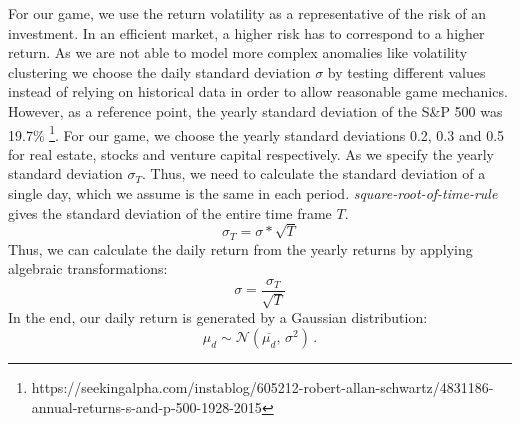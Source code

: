 For our game, we use the return volatility as a representative of the risk of an investment. In an efficient market, a higher risk has to correspond to a higher return. As we are not able to model more complex anomalies like volatility clustering \cite{lux2000volatility} we choose the daily standard deviation $\sigma$ by testing different values instead of relying on historical data in order to allow reasonable game mechanics. However, as a reference point, the yearly standard deviation of the S\&P 500 was 19.7\% \footnote{https://seekingalpha.com/instablog/605212-robert-allan-schwartz/4831186-annual-returns-s-and-p-500-1928-2015}. For our game, we choose the yearly standard deviations 0.2, 0.3 and 0.5 for real estate, stocks and venture capital respectively.
As we specify the yearly standard deviation $\sigma_T$. Thus, we need to calculate the standard deviation of a single day, which we assume is the same in each period. \textit{square-root-of-time-rule} gives the standard deviation of the entire time frame $T$.
\begin{equation}
    \sigma_T = \sigma*\sqrt{T}
\end{equation}
Thus, we can calculate the daily return from the yearly returns by applying algebraic transformations:
\begin{equation}
    \sigma = \frac{\sigma_T}{\sqrt{T}}
\end{equation}
In the end, our daily return is generated by a Gaussian distribution:
\begin{equation}
	\mu_d \sim \mathcal{N}(\overline{\mu_d},\,\sigma^{2})\,.
\end{equation}